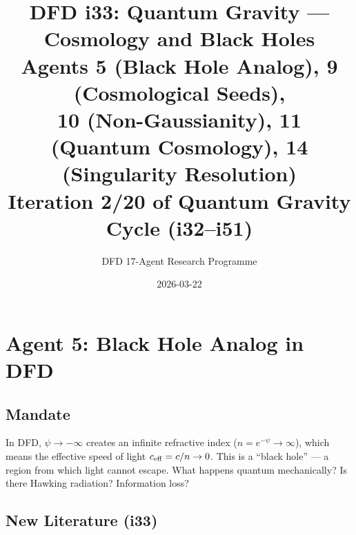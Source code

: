 \documentclass[11pt,a4paper]{article}
\title{DFD i33: Quantum Gravity --- Cosmology and Black Holes\\[6pt]
\large Agents 5 (Black Hole Analog), 9 (Cosmological Seeds),\\
10 (Non-Gaussianity), 11 (Quantum Cosmology), 14 (Singularity Resolution)\\[6pt]
\normalsize Iteration 2/20 of Quantum Gravity Cycle (i32--i51)}
\author{DFD 17-Agent Research Programme}
\date{2026-03-22}
\begin{document}
\maketitle
\tableofcontents
\newpage

\section{Agent 5: Black Hole Analog in DFD}
\label{sec:agent5}

\subsection{Mandate}

In DFD, $\psi \to -\infty$ creates an infinite refractive index ($n = e^{-\psi} \to \infty$), which means the effective speed of light $c_{\rm eff} = c/n \to 0$. This is a ``black hole'' --- a region from which light cannot escape. What happens quantum mechanically? Is there Hawking radiation? Information loss?

\subsection{New Literature (i33)}
\end{document}
